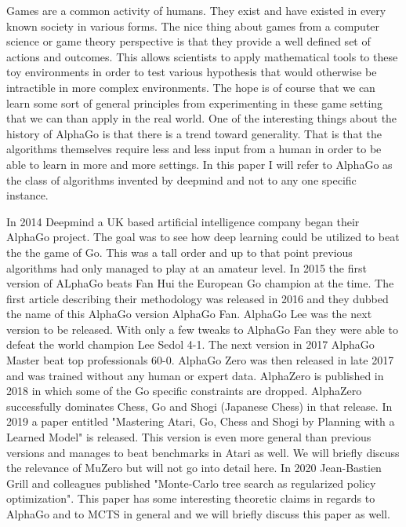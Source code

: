Games are a common activity of humans. They exist and have existed in every known society in various forms. The nice thing about games from a computer science or game theory perspective is that they provide a well defined set of actions and outcomes. This allows scientists to apply mathematical tools to these toy environments in order to test various hypothesis that would otherwise be intractible in more complex environments. The hope is of course that we can learn some sort of general principles from experimenting in these game setting that we can than apply in the real world. One of the interesting things about the history of AlphaGo is that there is a trend toward generality. That is that the algorithms themselves require less and less input from a human in order to be able to learn in more and more settings. In this paper I will refer to AlphaGo as the class of algorithms invented by deepmind and not to any one specific instance. 

In 2014 Deepmind a UK based artificial intelligence company began their AlphaGo project. The goal was to see how deep learning could be utilized to beat the the game of Go. This was a tall order and up to that point previous algorithms had 
only managed to play at an amateur level. In 2015 the first version of ALphaGo beats Fan Hui the European Go champion at the time. The first article describing their methodology was released in 2016 and they dubbed the name of this AlphaGo version AlphaGo Fan. AlphaGo Lee was the next version to be released. With only a few tweaks to AlphaGo Fan they were able to defeat the world champion Lee Sedol 4-1. The next version in 2017 AlphaGo Master beat top professionals 60-0. AlphaGo Zero was then released in late 2017 and was trained without any human or expert data. AlphaZero is published in 2018 in which some of the Go specific constraints are dropped. AlphaZero successfully dominates Chess, Go and Shogi (Japanese Chess) in that release. In 2019 a paper entitled "Mastering Atari, Go, Chess and Shogi by Planning with a Learned Model" is released. This version is even more general than previous versions and manages to beat benchmarks in Atari as well. We will briefly discuss the relevance of MuZero but will not go into detail here. In 2020 Jean-Bastien Grill and colleagues published "Monte-Carlo tree search as regularized policy optimization". This paper has some interesting theoretic claims in regards to AlphaGo and to MCTS in general and we will briefly discuss this paper as well. 